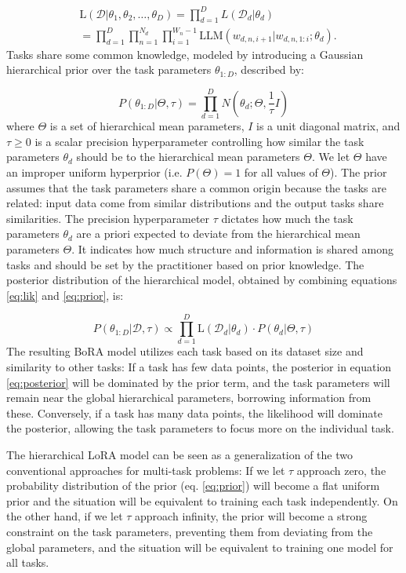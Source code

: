 \documentclass[fullpaper,final]{nldl}
\begin{document}
\begin{align}  \label{eq:lik}
    & \text{L}(\mathcal{D} | \theta_1, \theta_2, \ldots, \theta_D) = \prod_{d=1}^D L(\mathcal{D}_d | \theta_d) \nonumber \\
    &= \prod_{d=1}^D \prod_{n=1}^{N_d} \prod_{i=1}^{W_n-1} \text{LLM}(w_{d,n,i+1} | w_{d,n,1:i}; \theta_d).
\end{align}
%
Tasks share some common knowledge, modeled by introducing a Gaussian hierarchical prior over the task parameters $\theta_{1:D}$, described by:

\begin{equation} \label{eq:prior}
    P(\theta_{1:D} | \Theta, \tau) = \prod_{d=1}^D N(\theta_d ; \Theta, \frac{1}{\tau} I)
\end{equation}
where $\Theta$ is a set of hierarchical mean parameters, $I$ is a unit diagonal matrix, and $\tau \geq 0$ is a scalar precision hyperparameter controlling how similar the task parameters $\theta_d$ should be to the hierarchical mean parameters $\Theta$.
We let $\Theta$ have an improper uniform hyperprior (i.e. $P(\Theta) = 1$ for all values of $\Theta$). The prior assumes that the task parameters share a common origin because the tasks are related: input data come from similar distributions and the output tasks share similarities. The precision hyperparameter $\tau$ dictates how much the task parameters $\theta_d$ are a priori expected to deviate from the hierarchical mean parameters $\Theta$. It indicates how much structure and information is shared among tasks and should be set by the practitioner based on prior knowledge.
The posterior distribution of the hierarchical model, obtained by combining equations \ref{eq:lik} and \ref{eq:prior}, is:

\begin{equation} \label{eq:posterior}
    P(\theta_{1:D} | \mathcal{D}, \tau) \propto \prod_{d=1}^D \text{L}(\mathcal{D}_d | \theta_d) \cdot P(\theta_d | \Theta, \tau)
\end{equation}
%
The resulting BoRA model utilizes each task based on its dataset size and similarity to other tasks: If a task has few data points, the posterior in equation \ref{eq:posterior} will be dominated by the prior term, and the task parameters will remain near the global hierarchical parameters, borrowing information from these. Conversely, if a task has many data points, the likelihood will dominate the posterior, allowing the task parameters to focus more on the individual task.

The hierarchical LoRA model can be seen as a generalization of the two conventional approaches for multi-task problems: If we let $\tau$ approach zero, the probability distribution of the prior (eq. \ref{eq:prior}) will become a flat uniform prior and the situation will be equivalent to training each task independently. On the other hand, if we let $\tau$ approach infinity, the prior will become a strong constraint on the task parameters, preventing them from deviating from the global parameters, and the situation will be equivalent to training one model for all tasks.
\end{document}
